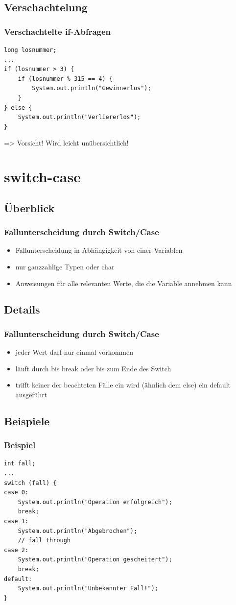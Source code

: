 \documentclass[final]{beamer}
\begin{document}
\subsection{Verschachtelung}
\begin{frame}[containsverbatim]
	\frametitle{Verschachtelte if-Abfragen}
	\begin{lstlisting}
long losnummer;
...
if (losnummer > 3) {
	if (losnummer % 315 == 4) {
		System.out.println("Gewinnerlos");
	}
} else {
	System.out.println("Verliererlos");
}
	\end{lstlisting}
	=> Vorsicht! Wird leicht unübersichtlich!
\end{frame}

\section{switch-case}
\subsection{Überblick}
\begin{frame}[containsverbatim]
	\frametitle{Fallunterscheidung durch Switch/Case}
	\begin{itemize}
		\item{Fallunterscheidung in Abhängigkeit von einer Variablen}
		\item{nur ganzzahlige Typen oder char}
		\item{Anweisungen für alle relevanten Werte, die die Variable annehmen kann}
	\end{itemize}
\end{frame}

\subsection{Details}
\begin{frame}[containsverbatim]
  \frametitle{Fallunterscheidung durch Switch/Case}
  \begin{itemize}
	\item{jeder Wert darf nur einmal vorkommen}
	\item{läuft durch bis break oder bis zum Ende des Switch}
	\item{trifft keiner der beachteten Fälle ein wird (ähnlich dem else) ein default ausgeführt}
  \end{itemize}
\end{frame}


\subsection{Beispiele}
\begin{frame}[containsverbatim]
	\frametitle{Beispiel}
	\begin{lstlisting}
int fall;
...
switch (fall) {
case 0:
	System.out.println("Operation erfolgreich");
	break;
case 1:
	System.out.println("Abgebrochen");
	// fall through
case 2:
	System.out.println("Operation gescheitert");
	break;
default:
	System.out.println("Unbekannter Fall!");
}
	\end{lstlisting}
\end{frame}
\end{document}
